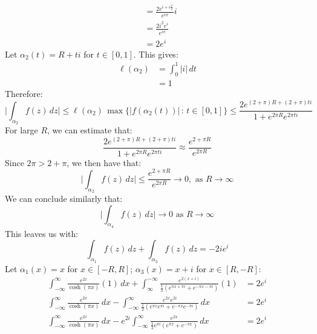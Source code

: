 \documentclass[letterpaper, titlepage, DIV=14]{scrartcl}
\begin{document}
\begin{enumerate}[i)]
\begin{align*}
        &= \frac{2e^{i+i\frac{\pi}{2}}}{e^{i\pi}} i \\
        &= \frac{2i^{2}e^{i}}{e^{i\pi}} \\
        &= 2e^{i}
    \end{align*}
    Let $\alpha_{2}(t) = R + ti$ for $t\in[0,1]$. This gives:
    \begin{align*}
      \ell(\alpha_{2}) &= \int_{0}^{1} |i| \, dt \\
        &= 1
    \end{align*}
    Therefore:
    \begin{equation*}
      \Big|\int_{\alpha_{2}} f(z) \, dz \Big| \leq \ell(\alpha_{2}) \, \max\{|f(\alpha_{2}(t))| \, : \, t\in[0,1]\} \leq \frac{2e^{(2+\pi)R + (2+\pi)ti}}{1+e^{2\pi R}e^{2\pi ti}}
    \end{equation*}
    For large $R$, we can estimate that:
    \begin{equation*}
      \frac{2e^{(2+\pi)R + (2+\pi)ti}}{1+e^{2\pi R}e^{2\pi ti}} \approx \frac{e^{2+\pi R}}{e^{2\pi R}}
    \end{equation*}
    Since $2\pi > 2+\pi$, we then have that:
    \begin{equation*}
      \Big|\int_{\alpha_{2}} f(z) \, dz \Big| \leq \frac{e^{2+\pi R}}{e^{2\pi R}} \to 0, \text{ as } R\to\infty
    \end{equation*}
    We can conclude similarly that:
    \begin{equation*}
      \Big|\int_{\alpha_{4}} f(z) \, dz \Big| \to 0 \text{ as } R\to\infty
    \end{equation*}
    This leaves us with:
    \begin{equation*}
      \int_{\alpha_{1}} f(z) \, dz + \int_{\alpha_{3}} f(z) \, dz = -2ie^{i}
    \end{equation*}
    Let $\alpha_{1}(x)=x$ for $x\in[-R,R]$; $\alpha_{3}(x)=x + i$ for $x\in[R,-R]$:
    \begin{align*}
      \int_{-\infty}^{\infty} \frac{e^{2x}}{\cosh(\pi x)} (1) \, dx + \int_{\infty}^{-\infty} \frac{e^{2(x+i)}}{\frac{1}{2}(e^{\pi x+\pi i}+e^{-\pi x-\pi i})}(1) &= 2e^{i} \\
      \int_{-\infty}^{\infty} \frac{e^{2x}}{\cosh(\pi x)} \, dx - \int_{-\infty}^{\infty} \frac{e^{2x}e^{2i}}{\frac{1}{2}(e^{\pi x}e^{\pi i}+e^{-\pi x}e^{-\pi i})} \, dx &= 2e^{i} \\
      \int_{-\infty}^{\infty} \frac{e^{2x}}{\cosh(\pi x)} \, dx - e^{2i}\int_{-\infty}^{\infty} \frac{e^{2x}}{\frac{1}{2}e^{\pi i}(e^{\pi x}+e^{-\pi x})} \, dx &= 2e^{i} 

\end{align*}
\end{enumerate}
\end{document}
